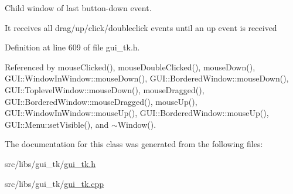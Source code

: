 Child window of last button-\/down event. 

It receives all drag/up/click/doubleclick events until an up event is received 

Definition at line 609 of file gui\-\_\-tk.\-h.



Referenced by mouse\-Clicked(), mouse\-Double\-Clicked(), mouse\-Down(), G\-U\-I\-::\-Window\-In\-Window\-::mouse\-Down(), G\-U\-I\-::\-Bordered\-Window\-::mouse\-Down(), G\-U\-I\-::\-Toplevel\-Window\-::mouse\-Down(), mouse\-Dragged(), G\-U\-I\-::\-Bordered\-Window\-::mouse\-Dragged(), mouse\-Up(), G\-U\-I\-::\-Window\-In\-Window\-::mouse\-Up(), G\-U\-I\-::\-Bordered\-Window\-::mouse\-Up(), G\-U\-I\-::\-Menu\-::set\-Visible(), and $\sim$\-Window().



The documentation for this class was generated from the following files\-:\begin{DoxyCompactItemize}
\item 
src/libs/gui\-\_\-tk/\hyperlink{gui__tk_8h}{gui\-\_\-tk.\-h}\item 
src/libs/gui\-\_\-tk/\hyperlink{gui__tk_8cpp}{gui\-\_\-tk.\-cpp}\end{DoxyCompactItemize}
